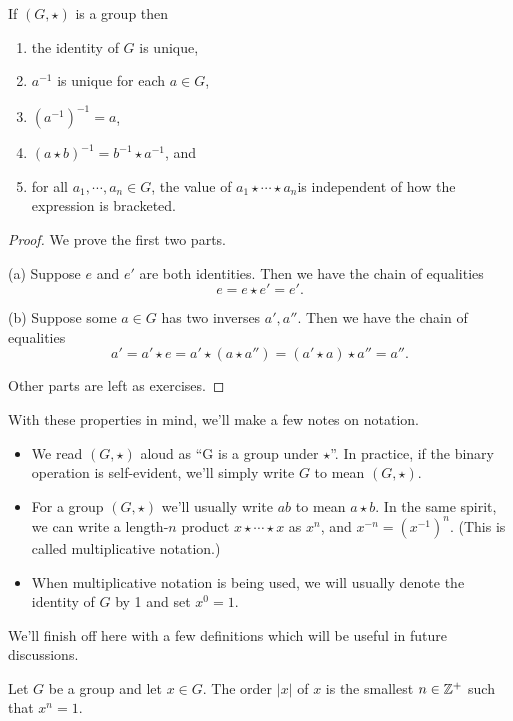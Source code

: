 \documentclass[../m171main.tex]{subfiles}
\begin{document}
\begin{theorem}[]
    If $(G, \star)$ is a group then
    \begin{enumerate}[label=(\alph*)]
        \item the identity of $G$ is unique,
        \item $a^{-1}$ is unique for each $a \in G$,
        \item $(a^{-1})^{-1} = a$,
        \item $(a \star b)^{-1} = b^{-1} \star a^{-1}$, and
        \item for all $a_1, \cdots, a_n \in G$, the value of $a_1 \star \cdots \star a_n$is independent of how the expression is bracketed.
    \end{enumerate}
\end{theorem}

\begin{proof}
    We prove the first two parts.
    
    (a) Suppose $e$ and $e'$ are both identities.
    Then we have the chain of equalities
    \[ e = e \star e' = e'. \]

    (b) Suppose some $a \in G$ has two inverses $a', a''$.
    Then we have the chain of equalities
    \[ a' = a' \star e = a' \star (a \star a'') = (a' \star a) \star a'' = a''. \]

    Other parts are left as exercises.
\end{proof}

With these properties in mind, we'll make a few notes on notation.
\begin{itemize}
    \item We read $(G, \star)$ aloud as ``G is a group under $\star$''.
    In practice, if the binary operation is self-evident, we'll simply write $G$ to mean $(G, \star)$.

    \item For a group $(G, \star)$ we'll usually write $ab$ to mean $a \star b$.
    In the same spirit, we can write a length-$n$ product $x \star \cdots \star x$ as $x^{n}$, and $x^{-n} = \left( x^{-1} \right)^{n}$.
    (This is called multiplicative notation.)

    \item When multiplicative notation is being used, we will usually denote the identity of $G$ by 1 and set $x^{0} = 1$.
\end{itemize}
We'll finish off here with a few definitions which will be useful in future discussions.

\begin{definition}
    Let $G$ be a group and let $x \in G$.
    The order $|x|$ of $x$ is the smallest $n \in \mathbb{Z}^+$ such that $x^{n} = 1$.
\end{definition}
\end{document}
